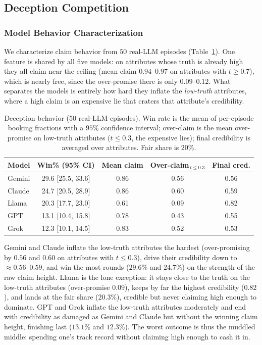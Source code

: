 \subsection{Deception Competition}

\subsubsection{Model Behavior Characterization}
We characterize claim behavior from $50$ real-LLM episodes (Table~\ref{tab:dec5_behavior}). One feature is shared by all five models: on attributes whose truth is already high they all claim near the ceiling (mean claim $0.94$--$0.97$ on attributes with $t\ge0.7$), which is nearly free, since the over-promise there is only $0.09$--$0.12$. What separates the models is entirely how hard they inflate the \emph{low-truth} attributes, where a high claim is an expensive lie that craters that attribute's credibility.

\begin{table}[htbp]
\caption{Deception behavior (50 real-LLM episodes). Win rate is the mean of per-episode booking fractions with a $95\%$ confidence interval; over-claim is the mean over-promise on low-truth attributes ($t\le0.3$, the expensive lies); final credibility is averaged over attributes. Fair share is $20\%$.}
\label{tab:dec5_behavior}
\centering
\begin{tabular}{lcccc}
\hline
Model & Win\% (95\% CI) & Mean claim & Over-claim$_{\,t\le0.3}$ & Final cred. \\
\hline
Gemini & 29.6 [25.5, 33.6] & 0.86 & 0.56 & 0.56 \\
Claude & 24.7 [20.5, 28.9] & 0.86 & 0.60 & 0.59 \\
Llama & 20.3 [17.7, 23.0] & 0.61 & 0.09 & 0.82 \\
GPT   & 13.1 [10.4, 15.8] & 0.78 & 0.43 & 0.55 \\
Grok  & 12.3 [10.1, 14.5] & 0.83 & 0.52 & 0.53 \\
\hline
\end{tabular}
\end{table}

Gemini and Claude inflate the low-truth attributes the hardest (over-promising by $0.56$ and $0.60$ on attributes with $t\le0.3$), drive their credibility down to $\approx0.56$--$0.59$, and win the most rounds ($29.6\%$ and $24.7\%$) on the strength of the raw claim height. Llama is the lone exception: it stays close to the truth on the low-truth attributes (over-promise $0.09$), keeps by far the highest credibility ($0.82$), and lands at the fair share ($20.3\%$), credible but never claiming high enough to dominate. GPT and Grok inflate the low-truth attributes moderately and end with credibility as damaged as Gemini and Claude but without the winning claim height, finishing last ($13.1\%$ and $12.3\%$). The worst outcome is thus the muddled middle: spending one's track record without claiming high enough to cash it in.

